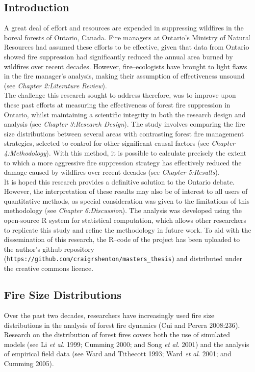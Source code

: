 \begin{spacing}{1.5}
\phantom
\phantom
\phantom
\phantom
\section{Introduction}
\phantom
\phantom
A great deal of effort and resources are expended in suppressing wildfires in the boreal forests of Ontario, Canada. Fire managers at Ontario's Ministry of Natural Resources had assumed these efforts to be effective, given that data from Ontario showed fire suppression had significantly reduced the annual area burned by wildfires over recent decades. However, fire--ecologists have brought to light flaws in the fire manager's analysis, making their assumption of effectiveness unsound (see \emph{Chapter 2:Literature Review}). \\

\noindent The challenge this research sought to address therefore, was to improve upon these past efforts at measuring the effectiveness of forest fire suppression in Ontario, whilst maintaining a scientific integrity in both the research design and analysis (see \emph{Chapter 3:Research Design}). The study involves comparing the fire size distributions between several areas with contrasting forest fire management strategies, selected to control for other significant causal factors (see \emph{Chapter 4:Methodology}). With this method, it is possible to calculate precisely the extent to which a more aggressive fire suppression strategy has effectively reduced the damage caused by wildfires over recent decades (see \emph{Chapter 5:Results}). \\

\noindent It is hoped this research provides a definitive solution to the Ontario debate. However, the interpretation of these results may also be of interest to all users of quantitative methods, as special consideration was given to the limitations of this methodology (see \emph{Chapter 6:Discussion}). The analysis was developed using the open-source R system for statistical computation, which allows other researchers to replicate this study and refine the methodology in future work. To aid with the dissemination of this research, the R--code of the project has been uploaded to the author's github repository (\texttt{https://github.com/craigrshent\linebreak on/masters\_thesis}) and distributed under the creative commons licence.

\subsection{Fire Size Distributions}
Over the past two decades, researchers have increasingly used fire size distributions in the analysis of forest fire dynamics (Cui and Perera 2008:236). Research on the distribution of forest fires covers both the use of simulated models (see Li \emph{et al}. 1999; Cumming 2000; and Song \emph{et al}. 2001) and the analysis of empirical field data (see Ward and Tithecott 1993; Ward \emph{et al}. 2001; and Cumming 2005). \\


\end{spacing}
